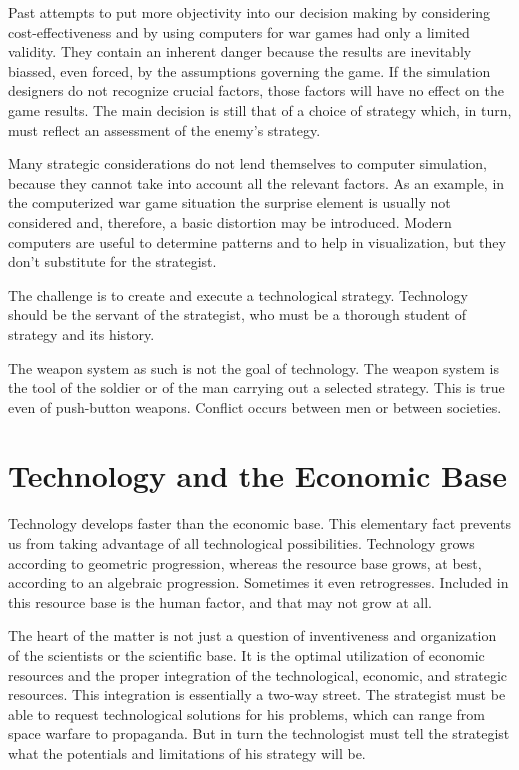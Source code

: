 Past attempts to put more objectivity into our decision making by considering cost-effectiveness and by using computers for war games had only a limited validity. They contain an inherent danger because the results are inevitably biassed, even forced, by the assumptions governing the game. If the simulation designers do not recognize crucial factors, those factors will have no effect on the game results. The main decision is still that of a choice of strategy which, in turn, must reflect an assessment of the enemy's strategy.

Many strategic considerations do not lend themselves to computer simulation, because they cannot take into account all the relevant factors. As an example, in the computerized war game situation the surprise element is usually not considered and, therefore, a basic distortion may be introduced. Modern computers are useful to determine patterns and to help in visualization, but they don't substitute for the strategist.

The challenge is to create and execute a technological strategy. Technology should be the servant of the strategist, who must be a thorough student of strategy and its history.

The weapon system as such is not the goal of technology. The weapon system is the tool of the soldier or of the man carrying out a selected strategy. This is true even of push-button weapons. Conflict occurs between men or between societies.

\section{Technology and the Economic Base}
Technology develops faster than the economic base. This elementary fact prevents us from taking advantage of all technological possibilities. Technology grows according to geometric progression, whereas the resource base grows, at best, according to an algebraic progression. Sometimes it even retrogresses. Included in this resource base is the human factor, and that may not grow at all.

The heart of the matter is not just a question of inventiveness and organization of the scientists or the scientific base. It is the optimal utilization of economic resources and the proper integration of the technological, economic, and strategic resources. This integration is essentially a two-way street. The strategist must be able to request technological solutions for his problems, which can range from space warfare to propaganda. But in turn the technologist must tell the strategist what the potentials and limitations of his strategy will be.

